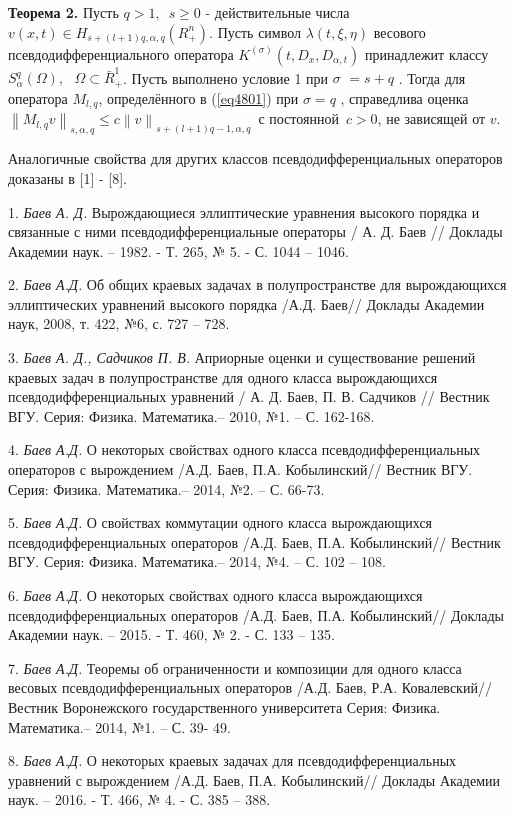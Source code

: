 {\textbf{Теорема 2.} Пусть $q > 1,\,\,\,s \geqslant 0$ - действительные числа
$v(x,t) \in H_{s + (l + 1)q,\alpha ,q} (R_ + ^n )$. Пусть символ $\lambda
(t,\xi ,\eta )$ весового псевдодифференциального оператора $K^{(\sigma
)}(t,D_x ,D_{\alpha ,t} )$ принадлежит классу $S_\alpha ^q (\Omega
),\,\,\,\,\Omega \subset \bar {R}_ + ^1 $. Пусть выполнено условие 1 при
$\sigma \,\, = s + q\,\,$. Тогда для оператора $M_{l,q} $, определённого в
(\ref{eq4801}) при $\sigma = q\,\,$, справедлива оценка $\left\| {M_{l,q} v}
\right\|_{s,\alpha ,q} \leqslant c\left\| v \right\|_{s + (l + 1)q - 1,\alpha ,q}
\,$
с постоянной $\,c > 0$, не зависящей от $v$.



Аналогичные свойства для других классов псевдодифференциальных операторов
доказаны в [1] - [8].

\litlist

1. {\it Баев А. Д.} Вырождающиеся эллиптические уравнения высокого порядка и
связанные с ними псевдодифференциальные операторы / А. Д. Баев // Доклады
Академии наук. -- 1982. - Т. 265, № 5. - С. 1044 -- 1046.

2. {\it Баев А.Д.} Об общих краевых задачах в полупространстве для вырождающихся
эллиптических уравнений высокого порядка /А.Д. Баев// Доклады Академии наук,
2008, т. 422, №6, с. 727 -- 728.

3. {\it Баев А. Д., Садчиков П. В.} Априорные оценки и существование решений
краевых задач в полупространстве для одного класса вырождающихся
псевдодифференциальных уравнений / А. Д. Баев, П. В. Садчиков // Вестник
ВГУ. Серия: Физика. Математика.-- 2010, №1. -- С. 162-168.

4. {\it Баев А.Д.} О некоторых свойствах одного класса псевдодифференциальных
операторов с вырождением /А.Д. Баев, П.А. Кобылинский// Вестник ВГУ. Серия:
Физика. Математика.-- 2014, №2. -- С. 66-73.

5. {\it Баев А.Д.} О свойствах коммутации одного класса вырождающихся
псевдодифференциальных операторов /А.Д. Баев, П.А. Кобылинский// Вестник
ВГУ. Серия: Физика. Математика.-- 2014, №4. -- С. 102 -- 108.

6. {\it Баев А.Д.} О некоторых свойствах одного класса вырождающихся
псевдодифференциальных операторов /А.Д. Баев, П.А. Кобылинский// Доклады
Академии наук. -- 2015. - Т. 460, № 2. - С. 133 -- 135.

7. {\it Баев А.Д.} Теоремы об ограниченности и композиции для одного класса
весовых псевдодифференциальных операторов /А.Д. Баев, Р.А. Ковалевский//
Вестник Воронежского государственного университета Серия: Физика.
Математика.-- 2014, №1. -- С. 39- 49.

8. {\it Баев А.Д.} О некоторых краевых задачах для псевдодифференциальных
уравнений с вырождением /А.Д. Баев, П.А. Кобылинский// Доклады Академии
наук. -- 2016. - Т. 466, № 4. - С. 385 -- 388.

}




